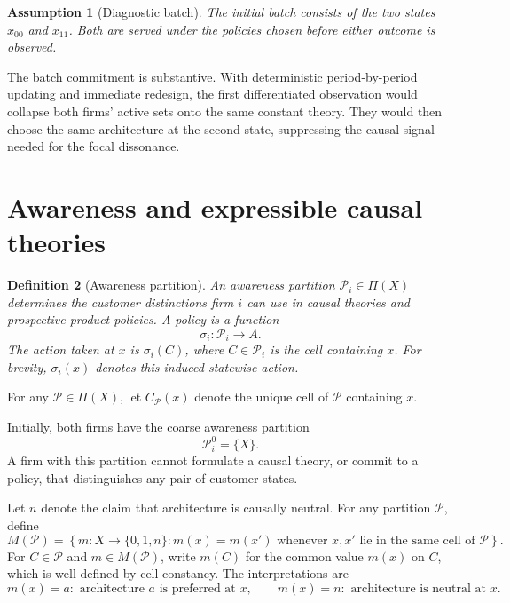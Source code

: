 \documentclass[11pt]{article}
\newtheorem{assumption}{Assumption}[section]
\newtheorem{definition}[assumption]{Definition}
\begin{document}
\begin{assumption}[Diagnostic batch]
\label{ass:batch}
The initial batch consists of the two states $x_{00}$ and $x_{11}$.  Both are
served under the policies chosen before either outcome is observed.
\end{assumption}

The batch commitment is substantive.  With deterministic period-by-period
updating and immediate redesign, the first differentiated observation would
collapse both firms' active sets onto the same constant theory.  They would
then choose the same architecture at the second state, suppressing the causal
signal needed for the focal dissonance.

\section{Awareness and expressible causal theories}
\label{sec:unawareness}

\begin{definition}[Awareness partition]
An awareness partition $\mathcal P_i\in\Pi(X)$ determines the customer
distinctions firm $i$ can use in causal theories and prospective product
policies.  A policy is a function
\[
\sigma_i:\mathcal P_i\longrightarrow A.
\]
The action taken at $x$ is $\sigma_i(C)$, where $C\in\mathcal P_i$ is the cell
containing $x$.  For brevity, $\sigma_i(x)$ denotes this induced statewise
action.
\end{definition}

For any $\mathcal P\in\Pi(X)$, let $C_{\mathcal P}(x)$ denote the unique cell
of $\mathcal P$ containing $x$.

Initially, both firms have the coarse awareness partition
\begin{equation}
\mathcal P_i^0=\{X\}.
\label{eq:coarse-partition}
\end{equation}
A firm with this partition cannot formulate a causal theory, or commit to a
policy, that distinguishes any pair of customer states.

Let $n$ denote the claim that architecture is causally neutral.  For any
partition $\mathcal P$, define
\begin{equation}
M(\mathcal P)
=
\left\{
m:X\longrightarrow\{0,1,n\}:
m(x)=m(x')
\text{ whenever }x,x'\text{ lie in the same cell of }\mathcal P
\right\}.
\label{eq:model-space}
\end{equation}
For $C\in\mathcal P$ and $m\in M(\mathcal P)$, write $m(C)$ for the common
value $m(x)$ on $C$, which is well defined by cell constancy.
The interpretations are
\[
m(x)=a:
\text{ architecture }a\text{ is preferred at }x,
\qquad
m(x)=n:
\text{ architecture is neutral at }x.
\]
\end{document}
